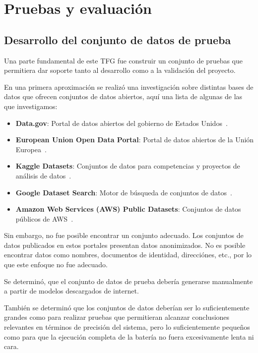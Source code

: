 \section{Pruebas y evaluación}\label{sec:pruebas_y_evaluacion}

\subsection*{Desarrollo del conjunto de datos de prueba}

Una parte fundamental de este TFG fue construir un conjunto de pruebas que permitiera dar soporte tanto al
desarrollo como a la validación del proyecto.

En una primera aproximación se realizó una investigación sobre distintas bases de datos que ofrecen
conjuntos de datos abiertos, aquí una lista de algunas de las que investigamos:

\begin{itemize}
    \item
    \textbf{Data.gov}: Portal de datos abiertos del gobierno de Estados Unidos~\cite{url_us_open_data}.

    \item
    \textbf{European Union Open Data Portal}: Portal de datos abiertos de la Unión Europea~\cite{url_eu_open_data}.

    \item
    \textbf{Kaggle Datasets}: Conjuntos de datos para competencias y proyectos de análisis de datos~\cite{url_kaggle}.

    \item
    \textbf{Google Dataset Search}: Motor de búsqueda de conjuntos de datos~\cite{url_google_open_data}.

    \item
    \textbf{Amazon Web Services (AWS) Public Datasets}: Conjuntos de datos públicos de AWS~\cite{url_aws_open_data}.
\end{itemize}

Sin embargo, no fue posible encontrar un conjunto adecuado.
Los conjuntos de datos publicados en estos portales presentan datos anonimizados.
No es posible encontrar datos como nombres, documentos de identidad, direcciónes, etc., por lo que este enfoque no fue
adecuado.

Se determinó, que el conjunto de datos de prueba debería generarse manualmente a partir de modelos descargados de
internet.

También se determinó que los conjuntos de datos deberían ser lo suficientemente grandes como para realizar pruebas que
permitieran alcanzar conclusiones relevantes en términos de precisión del sistema, pero lo suficientemente pequeños
como para que la ejecución completa de la batería no fuera excesivamente lenta ni cara.


